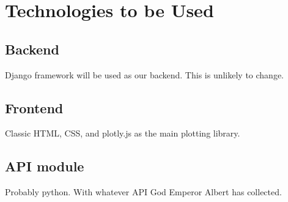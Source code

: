 \documentclass[a4paper,11pt]{article}
\begin{document}
\section{Technologies to be Used}
\subsection{Backend}
	Django framework will be used as our backend. This is unlikely to change.
\subsection{Frontend}
Classic HTML, CSS, and plotly.js as the main plotting library.

\subsection{API module}
Probably python. With whatever API God Emperor Albert has collected.
\end{document}
